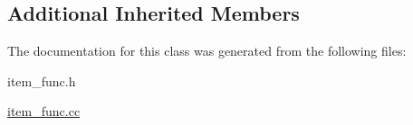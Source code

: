 \subsection*{Additional Inherited Members}


The documentation for this class was generated from the following files\+:\begin{DoxyCompactItemize}
\item 
item\+\_\+func.\+h\item 
\mbox{\hyperlink{item__func_8cc}{item\+\_\+func.\+cc}}\end{DoxyCompactItemize}
